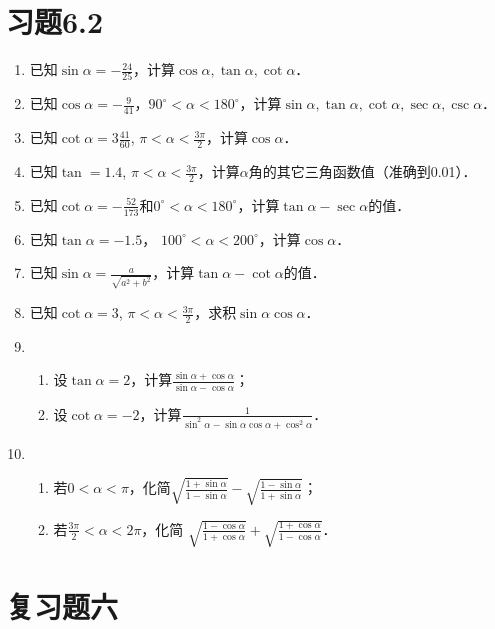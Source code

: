 \section*{习题6.2}
\begin{enumerate}
    \item 已知$\sin\alpha=-\frac{24}{25}$，计算$\cos\alpha, \tan\alpha, \cot\alpha$．
    \item 已知$\cos\alpha=-\frac{9}{41}$，$90^{\circ}<\alpha<180^{\circ}$，计算$\sin\alpha, \tan\alpha, \cot\alpha,\sec\alpha, \csc\alpha$．
\item 已知$\cot\alpha=3\frac{41}{60}$, $\pi<\alpha<\frac{3\pi}{2}$，计算$\cos\alpha$．
\item 已知$\tan=1.4$, $\pi<\alpha<\frac{3\pi}{2}$，计算$\alpha$角的其它三角函数值（准确到0.01）．
\item 已知$\cot\alpha=-\frac{52}{173}$和$0^{\circ}<\alpha<180^{\circ}$，计算$\tan\alpha-\sec\alpha$的值．
\item 已知$\tan\alpha=-1.5$， $100^{\circ}<\alpha<200^{\circ}$，计算$\cos\alpha$．
\item 已知$\sin\alpha=\frac{a}{\sqrt{a^2+b^2}}$，计算$\tan\alpha-\cot\alpha$的值．
\item 已知$\cot\alpha=3$, $\pi<\alpha<\frac{3\pi}{2}$，求积$\sin\alpha\cos\alpha$．
\item \begin{enumerate}
    \item 设$\tan\alpha=2$，计算$\frac{\sin\alpha+\cos\alpha}{\sin\alpha-\cos\alpha}$；
    \item 设$\cot\alpha=-2$，计算$\frac{1}{\sin^2\alpha-\sin\alpha\cos\alpha+\cos^2\alpha}$．
\end{enumerate}
\item \begin{enumerate}
    \item 若$0<\alpha<\pi$，化简$\sqrt{\frac{1+\sin\alpha}{1-\sin\alpha}}-\sqrt{\frac{1-\sin\alpha}{1+\sin\alpha}}$；
    \item 若$\frac{3\pi}{2}<\alpha<2\pi$，化简
    $\sqrt{\frac{1-\cos\alpha}{1+\cos\alpha}}+\sqrt{\frac{1+\cos\alpha}{1-\cos\alpha}}$．
\end{enumerate}
\end{enumerate}

\section*{复习题六}

